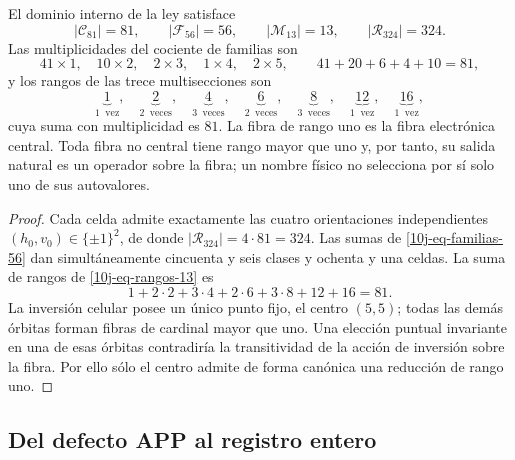 \begin{theorem}
\label{10j-thm-dominio}
El dominio interno de la ley satisface
\begin{equation}
 |\mathcal C_{81}|=81,
 \qquad |\mathcal F_{56}|=56,
 \qquad |\mathcal M_{13}|=13,
 \qquad |\mathcal R_{324}|=324.
 \label{10j-eq-censo-dominio}
\end{equation}
Las multiplicidades del cociente de familias son
\begin{equation}
 41\times1,\quad10\times2,\quad2\times3,\quad1\times4,\quad2\times5,
 \qquad 41+20+6+4+10=81,
 \label{10j-eq-familias-56}
\end{equation}
y los rangos de las trece multisecciones son
\begin{equation}
 \underbrace{1}_{1\ \text{ vez}},\quad
 \underbrace{2}_{2\ \text{ veces}},\quad
 \underbrace{4}_{3\ \text{ veces}},\quad
 \underbrace{6}_{2\ \text{ veces}},\quad
 \underbrace{8}_{3\ \text{ veces}},\quad
 \underbrace{12}_{1\ \text{ vez}},\quad
 \underbrace{16}_{1\ \text{ vez}},
 \label{10j-eq-rangos-13}
\end{equation}
cuya suma con multiplicidad es \(81\). La fibra de rango uno es la fibra
electrónica central. Toda fibra no central tiene rango mayor que uno y, por
tanto, su salida natural es un operador sobre la fibra; un nombre físico no
selecciona por sí solo uno de sus autovalores.
\end{theorem}

\begin{proof}
Cada celda admite exactamente las cuatro orientaciones independientes
\((h_0,v_0)\in\{\pm1\}^2\), de donde
\(|\mathcal R_{324}|=4\cdot81=324\). Las sumas de
\eqref{10j-eq-familias-56} dan simultáneamente cincuenta y seis clases y
ochenta y una celdas. La suma de rangos de \eqref{10j-eq-rangos-13} es
\[
 1+2\cdot2+3\cdot4+2\cdot6+3\cdot8+12+16=81.
\]
La inversión celular posee un único punto fijo, el centro \((5,5)\); todas
las demás órbitas forman fibras de cardinal mayor que uno. Una elección
puntual invariante en una de esas órbitas contradiría la transitividad de la
acción de inversión sobre la fibra. Por ello sólo el centro admite de forma
canónica una reducción de rango uno.
\end{proof}

\subsection{Del defecto APP al registro entero}

